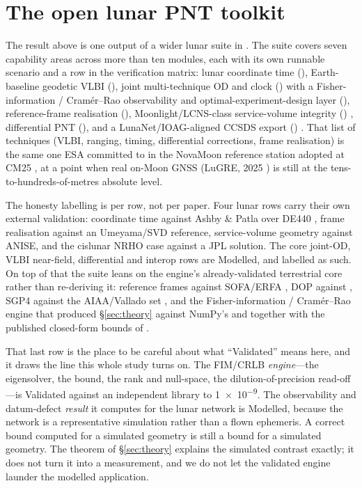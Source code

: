 \section{The open lunar PNT toolkit}
\label{sec:toolkit}

The result above is one output of a wider lunar suite in 
\citep{baweja2026kshana}. The suite covers seven capability areas across more
than ten  modules, each with its own runnable scenario and a row
in the verification matrix: lunar coordinate time (),
Earth-baseline geodetic VLBI (), joint multi-technique
OD and clock () with a Fisher-information /
Cram\'er--Rao observability and optimal-experiment-design layer (),
reference-frame realisation
(), Moonlight/LCNS-class service-volume integrity
() \citep{esa_moonlight,telespazio2024moonlight},
differential PNT (), and a LunaNet/IOAG-aligned CCSDS export
() \citep{nasa2025lnis}. That list of techniques (VLBI,
ranging, timing, differential corrections, frame realisation) is the same one ESA
committed to in the NovaMoon reference station adopted at CM25
\citep{molli2026novamoon}, at a point when real on-Moon GNSS (LuGRE, 2025
\citep{lugre2026}) is still at the tens-to-hundreds-of-metres absolute level.

The honesty labelling is per row, not per paper. Four lunar rows carry their own
external validation: coordinate time against Ashby \& Patla over DE440
\citep{ashby2024lunartime}, frame realisation against an Umeyama/SVD reference,
service-volume geometry against ANISE, and the cislunar NRHO case against a JPL
solution. The core joint-OD, VLBI near-field, differential and interop rows are
Modelled, and labelled as such. On top of that the suite leans on the engine's
already-validated terrestrial core rather than re-deriving it: reference frames
against SOFA/ERFA \citep{iausofa}, DOP against 
\citep{knowles2024gnsslibpy}, SGP4 against the AIAA/Vallado set
\citep{vallado2006}, and the Fisher-information / Cram\'er--Rao engine that
produced \S\ref{sec:theory} against NumPy's  and  together
with the published closed-form bounds of \citet{kay1993}.

That last row is the place to be careful about what ``Validated'' means here, and
it draws the line this whole study turns on. The FIM/CRLB \emph{engine}---the
eigensolver, the bound, the rank and null-space, the dilution-of-precision
read-off---is Validated against an independent library to \num{1e-9}. The
observability and datum-defect \emph{result} it computes for the lunar network is
Modelled, because the network is a representative simulation rather than a flown
ephemeris. A correct bound computed for a simulated geometry is still a bound for
a simulated geometry. The theorem of \S\ref{sec:theory} explains the simulated
contrast exactly; it does not turn it into a measurement, and we do not let the
validated engine launder the modelled application.
